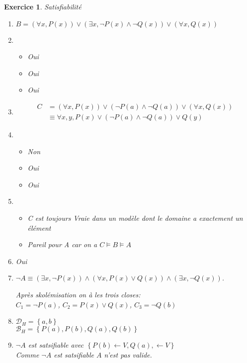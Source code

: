 \documentclass{article}
\theoremstyle{plain}
\newtheorem{exo}{Exercice}%
\begin{document}
\begin{exo} Satisfiabilité
\begin{enumerate}
    \item $B=(\forall x, P(x)) \vee (\exists x, \neg P(x) \wedge \neg Q(x)) 
            \vee (\forall x, Q(x))$
    \item \begin{itemize}
        \item Oui
        \item Oui
        \item Oui
    \end{itemize}
    \item \begin{align*}
        C   &=(\forall x, P(x)) \vee (\neg P(a) \wedge \neg Q(a)) 
                \vee (\forall x, Q(x)) \\
            &\equiv \forall x, y, P(x) \vee (\neg P(a) \wedge \neg Q(a)) 
                \vee Q(y)
    \end{align*}
    \item  \begin{itemize}
        \item Non
        \item Oui
        \item Oui
    \end{itemize}
    \item \begin{itemize}
        \item C est toujours Vraie dans un modèle dont le domaine a exactement un élément
        \item Pareil pour A car on a $C \models B  \models A$
    \end{itemize}
    \item  Oui
    \item $\neg A \equiv (\exists x, \neg P(x)) \wedge (\forall x, P(x) \vee Q(x)) 
        \wedge (\exists x, \neg Q(x))$.

        Après skolémisation on à les trois closes:\\
        $C_1 = \neg P(a)$, $C_2 = P(x) \vee Q(x)$, $C_3 = \neg Q(b)$

    \item $\mathcal{D}_H = \left\{a, b\right\} $\\
        $\mathcal{B}_H = \left\{P(a), P(b), Q(a), Q(b)\right\} $

    \item $\neg A$ est satsifiable avec $\left\{P(b) \leftarrow V, Q(a), \leftarrow V\right\}$\\
        Comme $\neg A$ est satsifiable $A$ n'est pas valide.
\end{enumerate}
\end{exo}
\end{document}
